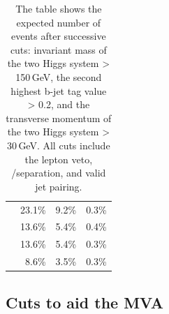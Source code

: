 \begin{table}[!htbp]
\begin{tabular}{lrrr}
\hline
\gammagamma{\Pphoton}{\BS}{\Pphoton}{\BS}{ \Pquark \Pquark \Pquark \Pquark}& 23.1\% & 9.2\%  & 0.3\%\\
\gammagamma{\Pphoton}{\BS}{\Pphoton}{\EPA}{ \Pquark \Pquark \Pquark \Pquark}& 13.6\% & 5.4\%  &0.4\%\\
\gammagamma{\Pphoton}{\EPA}{\Pphoton}{\BS}{ \Pquark \Pquark \Pquark \Pquark}& 13.6\% & 5.4\% & 0.3\%\\
\gammagamma{\Pphoton}{\EPA}{\Pphoton}{\EPA}{ \Pquark \Pquark \Pquark \Pquark}& 8.6\% & 3.5\% & 0.3\% \\
\hline \hline
\end{tabular}
\caption[List of signal and background samples after pre-selection cuts at .]
{The table shows the expected number of events after successive cuts:  invariant mass of the two Higgs system > 150\,GeV,  the  second highest b-jet tag value > 0.2, and the transverse momentum  of the two Higgs system  > 30\,GeV.  All cuts include the lepton veto, \eeToHHbbWW/\eeToHHbbbb separation, and valid jet pairing. \HiggsTableLow}
\label{tab:doubleHiggsPreslectionPart2}
\end{table}

\subsection{Cuts to aid the MVA}

